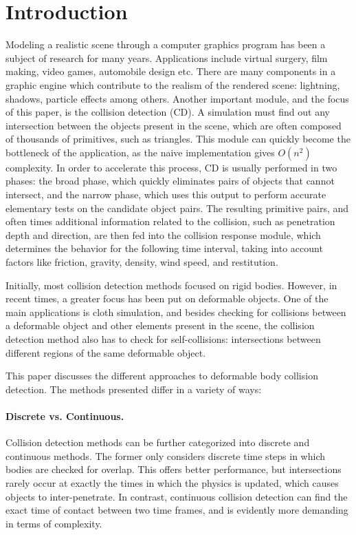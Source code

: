 \section{Introduction}
\label{section:intro}

Modeling a realistic scene through a computer graphics program has been a subject of research for many years. Applications include virtual surgery, film making, video games, automobile design etc. There are many components in a graphic engine which contribute to the realism of the rendered scene: lightning, shadows, particle effects among others. Another important module, and the focus of this paper, is the collision detection (CD). A simulation must find out any intersection between the objects present in the scene, which are often composed of thousands of primitives, such as triangles. This module can quickly become the bottleneck of the application, as the naive implementation gives $O(n^{2})$ complexity. In order to accelerate this process, CD is usually performed in two phases: the broad phase, which quickly eliminates pairs of objects that cannot intersect, and the narrow phase, which uses this output to perform accurate elementary tests on the candidate object pairs. The resulting primitive pairs, and often times additional information related to the collision, such as penetration depth and direction, are then fed into the collision response module, which determines the behavior for the following time interval, taking into account factors like friction, gravity, density, wind speed, and restitution.

Initially, most collision detection methods focused on rigid bodies. However, in recent times, a greater focus has been put on deformable objects. One of the main applications is cloth simulation, and besides checking for collisions between a deformable object and other elements present in the scene, the collision detection method also has to check for self-collisions: intersections between different regions of the same deformable object.

This paper discusses the different approaches to deformable body collision detection. The methods presented differ in a variety of ways:

\paragraph{Discrete vs. Continuous.}

Collision detection methods can be further categorized into discrete and continuous methods. The former only considers discrete time steps in which bodies are checked for overlap. This offers better performance, but intersections rarely occur at exactly the times in which the physics is updated, which causes objects to inter-penetrate. In contrast, continuous collision detection can find the exact time of contact between two time frames, and is evidently more demanding in terms of complexity.

